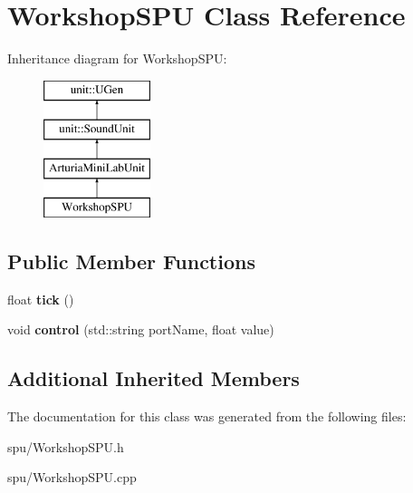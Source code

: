\hypertarget{classWorkshopSPU}{}\section{Workshop\+S\+PU Class Reference}
\label{classWorkshopSPU}
Inheritance diagram for Workshop\+S\+PU\+:\begin{figure}[H]
\begin{center}
\leavevmode
\includegraphics[height=4.000000cm]{classWorkshopSPU}
\end{center}
\end{figure}
\subsection*{Public Member Functions}
\begin{DoxyCompactItemize}
\item 
float {\bfseries tick} ()\hypertarget{classWorkshopSPU_a8721f1f7429f4b7f3ced46fc781674b7}{}\label{classWorkshopSPU_a8721f1f7429f4b7f3ced46fc781674b7}

\item 
void {\bfseries control} (std\+::string port\+Name, float value)\hypertarget{classWorkshopSPU_a72adc07c2054fd0cdfe623da30bb23ba}{}\label{classWorkshopSPU_a72adc07c2054fd0cdfe623da30bb23ba}

\end{DoxyCompactItemize}
\subsection*{Additional Inherited Members}


The documentation for this class was generated from the following files\+:\begin{DoxyCompactItemize}
\item 
spu/Workshop\+S\+P\+U.\+h\item 
spu/Workshop\+S\+P\+U.\+cpp\end{DoxyCompactItemize}
